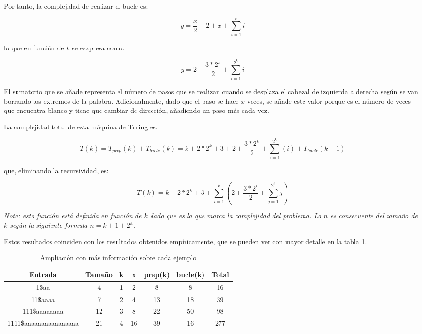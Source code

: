 \documentclass{uc3mpracticas}
\begin{document}
  \vspace{2mm}

  Por tanto, la complejidad de realizar el bucle es:

  $$ y = \frac{x}{2} + 2 + x + \displaystyle\sum_{i=1}^x i $$

  lo que en función de $k$ se esxpresa como:

  $$ y = 2 + \frac{3*2^k}{2} + \displaystyle\sum_{i=1}^{2^k} i $$


  El sumatorio que se añade representa el número de pasos que se realizan cuando se desplaza el cabezal de izquierda a derecha según se van borrando los extremos de la palabra. Adicionalmente, dado que el paso se hace $x$ veces, se añade este valor porque es el número de veces que encuentra blanco y tiene que cambiar de dirección, añadiendo un paso más cada vez.



  \vspace{2mm}

  La complejidad total de esta máquina de Turing es:


  $$ T(k) = T_{prep}(k) + T_{bucle}(k) = k + 2*2^k + 3 + 2 + \frac{3*2^k}{2} + \displaystyle\sum_{i=1}^{2^k} (i) + T_{bucle}(k-1)$$

  que, eliminando la recursividad, es:

  $$ T(k) =  k + 2*2^k + 3 + \displaystyle\sum_{i=1}^k (2 + \frac{3*2^i}{2} + \displaystyle\sum_{j=1}^{2^i} j)$$

  \textit{Nota: esta función está definida en función de $k$ dado que es la que marca la complejidad del problema. La $n$ es consecuente del tamaño de $k$ según la siguiente formula $ n = k + 1 + 2^k $. }

  \vspace{2mm}

  Estos resultados coinciden con los resultados obtenidos empíricamente, que se pueden ver con mayor detalle en la tabla \ref{tab:detalle}.

  \begin{table}[!h]
    \centering
  \begin{tabular}{|c|c|c|c|c|c|c|}
  \hline
  \textbf{Entrada}       & \textbf{Tamaño} & \textbf{k} & \textbf{x} & \textbf{prep(k)} & \textbf{bucle(k)} & \textbf{Total} \\ \hline
  1\$aa                  & 4               &   1        & 2           & 8                & 8                 & 16             \\ \hline
  11\$aaaa               & 7               &   2        & 4           & 13               & 18                & 39             \\ \hline
  111\$aaaaaaaa          & 12              &   3        & 8           & 22               & 50                & 98             \\ \hline
  1111\$aaaaaaaaaaaaaaaa & 21              &   4        & 16          & 39               & 16                & 277            \\ \hline
  \end{tabular}
  \caption{Ampliación con más información sobre cada ejemplo}
  \label{tab:detalle}
\end{table}
\end{document}
